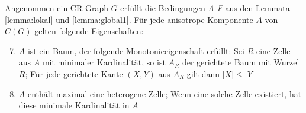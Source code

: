 \begin{Lemma}
	Angenommen ein CR-Graph $G$ erfüllt die Bedingungen \emph{A-F} aus den Lemmata \ref{lemma:lokal} und \ref{lemma:global1}.
	Für jede anisotrope Komponente $A$ von $C(G)$ gelten folgende Eigenschaften:
	
	\begin{enumerate}[label=(\Alph*)]
		\setcounter{enumi}{6}
		\item $A$ ist ein Baum, der folgende Monotonieeigenschaft erfüllt: Sei $R$ eine Zelle aus $A$ mit minimaler Kardinalität, so ist $A_R$ der gerichtete Baum mit Wurzel $R$; Für jede gerichtete Kante $(X,Y)$ aus $A_R$ gilt dann $|X|\leq |Y|$
		\item $A$ enthält maximal eine heterogene Zelle; Wenn eine solche Zelle existiert, hat diese minimale Kardinalität in $A$
	\end{enumerate}
	\label{lemma:global2}
\end{Lemma}

